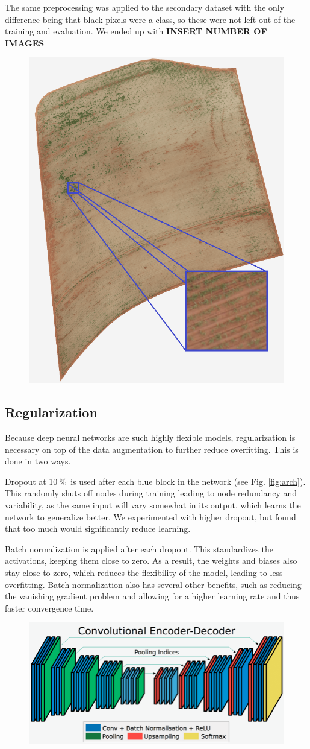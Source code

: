 \documentclass{article}
\newcommand{\pro}{\ensuremath{\ \%}}
\begin{document}
The same preprocessing was applied to the secondary dataset with the only difference being that black pixels were a class, so these were not left out of the training and evaluation.
We ended up with \textbf{INSERT NUMBER OF IMAGES}
\begin{figure}[!h]
	\centering
	\includegraphics[width=0.5\linewidth]{../../poster/raw-min3}
	\caption{}
	\label{fig:raw-min2}
\end{figure}



\subsection{Regularization}
Because deep neural networks are such highly flexible models, regularization is necessary on top of the data augmentation to further reduce overfitting.
This is done in two ways.

Dropout at 10\pro\ is used after each blue block in the network (see Fig. \ref{fig:arch}).
This randomly shuts off nodes during training leading to node redundancy and variability, as the same input will vary somewhat in its output, which learns the network to generalize better.
We experimented with higher dropout, but found that too much would significantly reduce learning.

Batch normalization is applied after each dropout.
This standardizes the activations, keeping them close to zero.
As a result, the weights and biases also stay close to zero, which reduces the flexibility of the model, leading to less overfitting.
Batch normalization also has several other benefits, such as reducing the vanishing gradient problem and allowing for a higher learning rate and thus faster convergence time. \cite{bn}
\begin{figure}[!h]
	\centering
	\includegraphics[width=0.7\linewidth]{../../poster/Encoder-Decoder2}
	\caption{}
	\label{fig:encoder-decoder2}
\end{figure}
\end{document}
